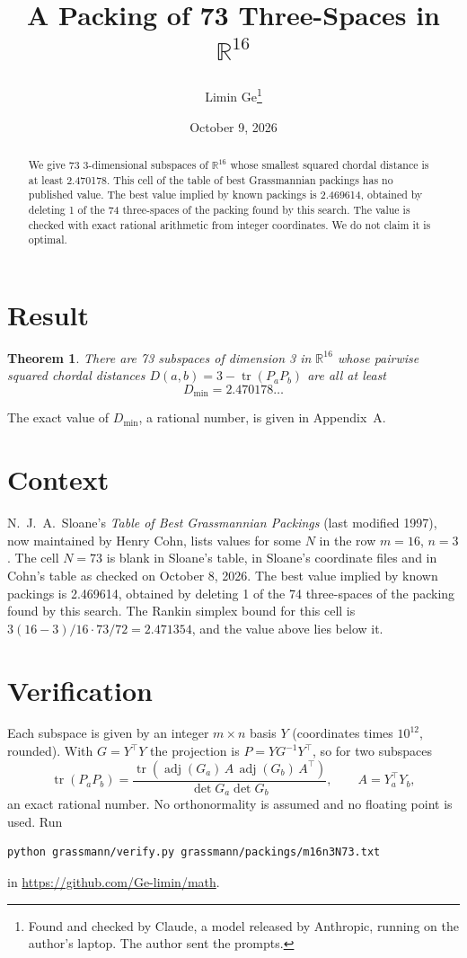 \documentclass[11pt,a4paper]{article}
\title{A Packing of 73 Three-Spaces in $\mathbb{R}^{16}$}
\author{Limin Ge\thanks{Found and checked by Claude, a model released by Anthropic, running on the author's laptop. The author sent the prompts.}}
\date{October 9, 2026}
\newtheorem*{theorem}{Theorem}
\begin{document}
\maketitle
\begin{abstract}
We give 73 3-dimensional subspaces of $\mathbb{R}^{16}$ whose smallest squared chordal distance is at least 2.470178. This cell of the table of best Grassmannian packings has no published value. The best value implied by known packings is 2.469614, obtained by deleting 1 of the 74 three-spaces of the packing found by this search. The value is checked with exact rational arithmetic from integer coordinates. We do not claim it is optimal.
\end{abstract}

\section{Result}
\begin{theorem}
There are 73 subspaces of dimension 3 in $\mathbb{R}^{16}$ whose pairwise squared chordal distances $D(a,b) = 3 - \operatorname{tr}(P_aP_b)$ are all at least
\[ D_{\min} = 2.470178\ldots \]
\end{theorem}
The exact value of $D_{\min}$, a rational number, is given in Appendix~A.


\section{Context}
N.~J.~A.~Sloane's \emph{Table of Best Grassmannian Packings} (last modified 1997), now maintained by Henry Cohn, lists values for some $N$ in the row $m=16$, $n=3$. The cell $N=73$ is blank in Sloane's table, in Sloane's coordinate files and in Cohn's table as checked on October 8, 2026. The best value implied by known packings is 2.469614, obtained by deleting 1 of the 74 three-spaces of the packing found by this search. The Rankin simplex bound for this cell is $3(16-3)/16\cdot 73/72 = 2.471354$, and the value above lies below it.


\section{Verification}
Each subspace is given by an integer $m\times n$ basis $Y$ (coordinates times $10^{12}$, rounded). With $G=Y^\top Y$ the projection is $P=YG^{-1}Y^\top$, so for two subspaces
\[ \operatorname{tr}(P_aP_b)=\frac{\operatorname{tr}(\operatorname{adj}(G_a)\,A\,\operatorname{adj}(G_b)\,A^\top)}{\det G_a\det G_b},\qquad A=Y_a^\top Y_b, \]
an exact rational number. No orthonormality is assumed and no floating point is used. Run
\begin{verbatim}
python grassmann/verify.py grassmann/packings/m16n3N73.txt
\end{verbatim}
in \url{https://github.com/Ge-limin/math}.
\end{document}
